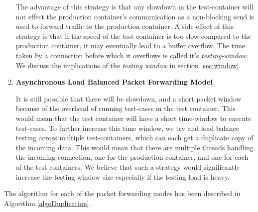 \begin{enumerate}[leftmargin=*]
The advantage of this strategy is that any slowdown in the test-container will not effect the production container's communication as a non-blocking send is used to forward traffic to the production container. 
A side-effect of this strategy is that if the speed of the test-container is too slow compared to the production container, it may eventually lead to a buffer overflow. 
The time taken by a connection before which it overflows is called it's \emph{testing-window}.
We discuss the implications of the \emph{testing window} in section \ref{sec:window}.  

\item \textbf{Asynchronous Load Balanced Packet Forwarding Model}

It is still possible that there will be slowdown, and a short packet window because of the overhead of running test-cases in the test container. 
This would mean that the test container will have a short time-window to execute test-cases.
To further increase this time window, we try and load balance testing across multiple test-containers, which can each get a duplicate copy of the incoming data. 
This would mean that there are multiple threads handling the incoming connection, one for the production container, and one for each of the test containers.
We believe that such a strategy would significantly increase the testing window size especially if the testing load is heavy.

\end{enumerate}

The algorithm for each of the packet forwarding modes has been described in Algorithm.\ref{algoDuplication}. 



